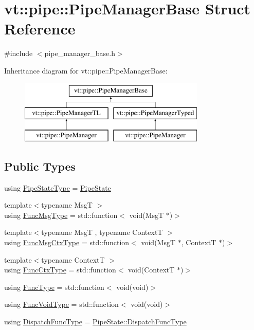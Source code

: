\hypertarget{structvt_1_1pipe_1_1_pipe_manager_base}{}\section{vt\+:\+:pipe\+:\+:Pipe\+Manager\+Base Struct Reference}
\label{structvt_1_1pipe_1_1_pipe_manager_base}


{\ttfamily \#include $<$pipe\+\_\+manager\+\_\+base.\+h$>$}

Inheritance diagram for vt\+:\+:pipe\+:\+:Pipe\+Manager\+Base\+:\begin{figure}[H]
\begin{center}
\leavevmode
\includegraphics[height=3.000000cm]{structvt_1_1pipe_1_1_pipe_manager_base}
\end{center}
\end{figure}
\subsection*{Public Types}
\begin{DoxyCompactItemize}
\item 
using \hyperlink{structvt_1_1pipe_1_1_pipe_manager_base_a1364798bda487c9fb04879599f96c507}{Pipe\+State\+Type} = \hyperlink{structvt_1_1pipe_1_1_pipe_state}{Pipe\+State}
\item 
{\footnotesize template$<$typename MsgT $>$ }\\using \hyperlink{structvt_1_1pipe_1_1_pipe_manager_base_aa54eee64ab32a27777a672d49eb861f4}{Func\+Msg\+Type} = std\+::function$<$ void(MsgT $\ast$)$>$
\item 
{\footnotesize template$<$typename MsgT , typename ContextT $>$ }\\using \hyperlink{structvt_1_1pipe_1_1_pipe_manager_base_a73fdf82ece0411b3dc644c99b763f7a9}{Func\+Msg\+Ctx\+Type} = std\+::function$<$ void(MsgT $\ast$, ContextT $\ast$)$>$
\item 
{\footnotesize template$<$typename ContextT $>$ }\\using \hyperlink{structvt_1_1pipe_1_1_pipe_manager_base_ad8463823b6b4cfdb67c119d6d22e3bac}{Func\+Ctx\+Type} = std\+::function$<$ void(ContextT $\ast$)$>$
\item 
using \hyperlink{structvt_1_1pipe_1_1_pipe_manager_base_a7ddc75a14fa50cd8521641ef6f9ea78d}{Func\+Type} = std\+::function$<$ void(void)$>$
\item 
using \hyperlink{structvt_1_1pipe_1_1_pipe_manager_base_acd6f0c71f38f08d53f85e83b65406d77}{Func\+Void\+Type} = std\+::function$<$ void(void)$>$
\item 
using \hyperlink{structvt_1_1pipe_1_1_pipe_manager_base_a983e301505317c5ba2041461e7dec84a}{Dispatch\+Func\+Type} = \hyperlink{structvt_1_1pipe_1_1_pipe_state_aa6d3f6b8d9c1a4d1f261bc563ff99e3e}{Pipe\+State\+::\+Dispatch\+Func\+Type}
\end{DoxyCompactItemize}
